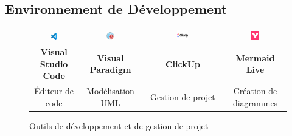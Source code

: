 \documentclass[12pt,a4paper]{report}
\begin{document}
	\subsection{Environnement de Développement}
	\begin{figure}[H]
		\centering
		\begin{tabular}{cccc}
			\includegraphics[width=0.15\textwidth]{images/vs_code.jpg} &
			\includegraphics[width=0.15\textwidth]{images/visual_paradigm.png} &
			\includegraphics[width=0.15\textwidth]{images/clickup.png} &
			\includegraphics[width=0.15\textwidth]{images/mermaid_live_editor.png} \\
			\textbf{Visual Studio Code} & \textbf{Visual Paradigm} & \textbf{ClickUp} & \textbf{Mermaid Live} \\
			Éditeur de code & Modélisation UML & Gestion de projet & Création de diagrammes \\
		\end{tabular}
		\caption{Outils de développement et de gestion de projet}
	\end{figure}
	
\end{document}
